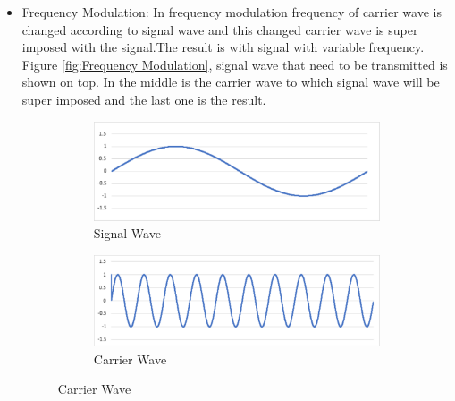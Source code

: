 \documentclass[12pt]{article}
\begin{document}
\begin{enumerate}
\begin{itemize}






        \item Frequency Modulation: In frequency modulation frequency of carrier wave is changed according to signal wave and this changed carrier wave is super imposed with the signal.The result is with signal with variable frequency. Figure \ref{fig:Frequency Modulation}, signal wave that need to be transmitted is shown on top. In the middle is the carrier wave to which signal wave will be super imposed and the last one is the result.
        
 \begin{figure}[H]
\begin{subfigure}[t]{\linewidth}
  \centering
  \includegraphics[width=.5\linewidth]{Images/signalWave.pdf}  
  \caption{Signal Wave}
\end{subfigure}
\begin{subfigure}[t]{\linewidth}
  \centering
  \includegraphics[width=.5\linewidth]{Images/carrierWave.pdf}  
  \caption{Carrier Wave}
  

\end{subfigure}
\end{figure}
\end{itemize}
\end{enumerate}
\end{document}
